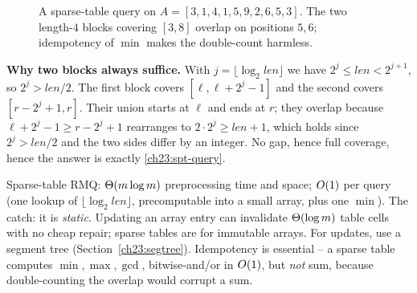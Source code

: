 \begin{figure}[H]
\centering
{}
\caption{A sparse-table query on $A=[3,1,4,1,5,9,2,6,5,3]$. The two length-$4$ blocks
covering $[3,8]$ overlap on positions $5,6$; idempotency of $\min$ makes the double-count
harmless.}
\label{ch23:fig-sparse}
\end{figure}

\begin{whybox}
\textbf{Why two blocks always suffice.} With $j=\lfloor\log_2\textit{len}\rfloor$ we have
$2^j\le\textit{len}<2^{j+1}$, so $2^j>\textit{len}/2$. The first block covers
$[\ell,\ell+2^j-1]$ and the second covers $[r-2^j+1,r]$. Their union starts at $\ell$ and
ends at $r$; they overlap because $\ell+2^j-1 \ge r-2^j+1$ rearranges to
$2\cdot 2^j \ge \textit{len}+1$, which holds since $2^j>\textit{len}/2$ and the two sides
differ by an integer. No gap, hence full coverage, hence the answer is exactly
\eqref{ch23:spt-query}.
\end{whybox}

\begin{complexitybox}
Sparse-table RMQ: $\Theta(m\log m)$ preprocessing time and space; $O(1)$ per query (one
lookup of $\lfloor\log_2 \textit{len}\rfloor$, precomputable into a small array, plus one
$\min$). The catch: it is \emph{static}. Updating an array entry can invalidate
$\Theta(\log m)$ table cells with no cheap repair; sparse tables are for immutable arrays. For
updates, use a segment tree (Section~\ref{ch23:segtree}). Idempotency is essential -- a
sparse table computes $\min,\max,\gcd$, bitwise-and/or in $O(1)$, but \emph{not} sum,
because double-counting the overlap would corrupt a sum.
\end{complexitybox}

